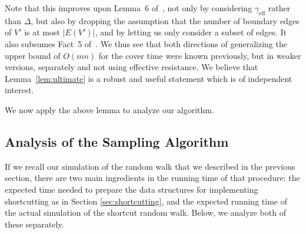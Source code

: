\documentclass[11pt, letterpaper]{article}
\newcommand{\diameff}{\gamma_{\mathrm{eff}}}
\newcommand{\diamdist}{\Delta}
\begin{document}
Note that this improves upon Lemma~6 of~\cite{KelnerM09}, not only by considering $\diameff$ rather than $\diamdist$, but also by dropping the assumption that the number of boundary edges of $V'$ is at most $|E(V')|$, and by letting us only consider a subset of edges. It also subsumes Fact~5 of~\cite{KelnerM09}. We thus see that both directions of generalizing the upper bound of $O(mn)$ for the cover time were known previously, but in weaker versions, separately and not using effective resistance. We believe that Lemma~\ref{lem:ultimate} is a robust and useful statement which is of independent interest.

We now apply the above lemma to analyze our algorithm.

\subsection{Analysis of the Sampling Algorithm}\label{sec:analysis_sampling}

If we recall our simulation of the random walk that we described in the previous section, there are two main ingredients in the running time of that procedure: the expected time needed to prepare the data structures for implementing shortcutting as in Section \ref{sec:shortcutting}, and the expected running time of the actual simulation of the shortcut random walk. Below, we analyze both of these separately.
\end{document}
